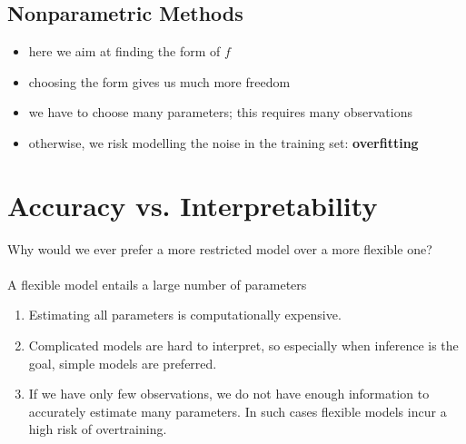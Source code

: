 		\subsection{Nonparametric Methods}
			\begin{itemize}
				\item here we aim at finding the form of $f$
				\item choosing the form gives us much more freedom
				\item we have to choose many parameters; this requires many observations
				\item otherwise, we risk modelling the noise in the training set: \textbf{overfitting}
			\end{itemize}
			\begin{figure}[ht]
			  \centering
			  \qquad
			  \qquad
			\end{figure}
	
	\section{Accuracy vs. Interpretability}
		Why would we ever prefer a more restricted model over a more flexible one?\\\\
		A flexible model entails a large number of parameters
		\begin{enumerate}
			\item Estimating all parameters is computationally expensive.
			\item Complicated models are hard to interpret, so especially when inference is the goal, simple models are preferred.
			\item If we have only few observations, we do not have enough information to accurately estimate many parameters.
			In such cases flexible models incur a high risk of overtraining.
		\end{enumerate}
	
